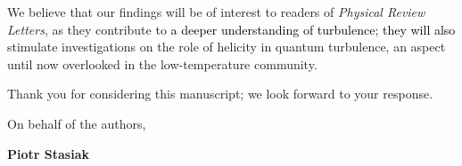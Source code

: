 \documentclass[a4paper,10pt]{letter}
\def\red#1{\textcolor{black}{#1}}
\begin{document}
We believe that our findings will be of interest to readers of 
\textit{Physical Review Letters}, as they contribute to 
\red{a deeper understanding of turbulence};
\red{they will also} stimulate investigations
on the role of helicity in quantum turbulence, an aspect until now 
overlooked in the low-temperature community.  


Thank you for considering this manuscript; we look forward to your response.
\vspace{0.5cm}

On behalf of the authors,

\vspace{1cm}

\textbf{Piotr Stasiak}
\end{document}

